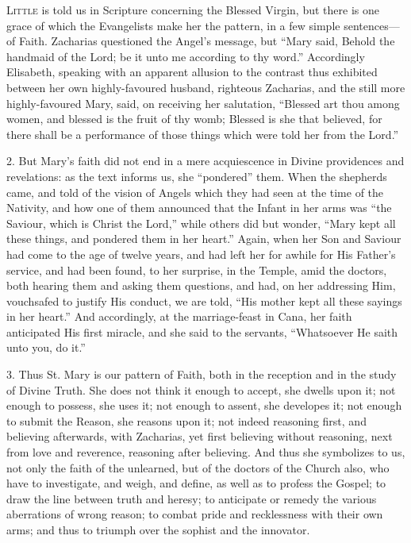 L\textsc{ittle} is told us in Scripture concerning the Blessed Virgin, but
there is one grace of which the Evangelists make her the pattern, in a
few simple sentences—of Faith. Zacharias questioned the Angel's
message, but ``Mary said, Behold the handmaid of the Lord; be it
unto me according to thy word.'' Accordingly Elisabeth, speaking
with an apparent allusion to the contrast thus exhibited between her
own highly-favoured husband, righteous Zacharias, and the still more
highly-favoured Mary, said, on receiving her salutation, ``Blessed
art thou among women, and blessed is the fruit of thy womb; Blessed is
she that believed, for there shall be a performance of those things
which were told her from the Lord.''

2. But Mary's faith did not end in a mere acquiescence in Divine
providences and revelations: as the text informs us, she
``pondered'' them. When the shepherds came, and told of the
vision of Angels which they had seen at the time of the Nativity, and
how one of them announced that the Infant in her arms was ``the
Saviour, which is Christ the Lord,'' while others did but wonder,
``Mary kept all these things, and pondered them in her
heart.'' Again, when her Son and Saviour had come to the age of
twelve years, and had left her for awhile for His Father's service,
and had been found, to her surprise, in the Temple, amid the doctors,
both hearing them and asking them questions, and had, on her
addressing Him, vouchsafed to justify His conduct, we are told,
``His mother kept all these sayings in her heart.'' And
accordingly, at the marriage-feast in Cana, her faith anticipated His
first miracle, and she said to the servants, ``Whatsoever He saith
unto you, do it.''

3. Thus St. Mary is our pattern of Faith, both in the reception and
in the study of Divine Truth. She does not think it enough to accept,
she dwells upon it; not enough to possess, she uses it; not enough to
assent, she developes it; not enough to submit the Reason, she reasons
upon it; not indeed reasoning first, and believing afterwards, with
Zacharias, yet first believing without reasoning, next from love and
reverence, reasoning after believing. And thus she symbolizes to us,
not only the faith of the unlearned, but of the doctors of the Church
also, who have to investigate, and weigh, and define, as well as to
profess the Gospel; to draw the line between truth and heresy; to
anticipate or remedy the various aberrations of wrong reason; to combat
pride and recklessness with their own arms; and thus to triumph over
the sophist and the innovator.

